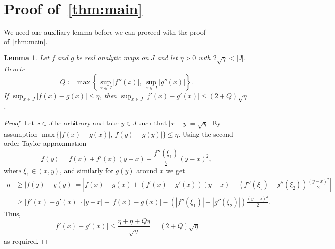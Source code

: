 \documentclass[12pt,]{article}
\def\cref#1{\ref{#1}}%
\newtheorem{lemma}[theorem]{Lemma}
\theoremstyle{definition}
\theoremstyle{remark}
\newcommand{\0}{\mathbf{0}}
\begin{document}
{%
\section{Proof of~\cref{thm:main}}\label{sec:ProofSufficientCond}

We need one auxiliary lemma before we can proceed with the proof of~\cref{thm:main}.

\begin{lemma}\label{thm:analyticity}
Let $f$ and $g$ be real analytic maps on $J$
and let $\eta>0$ with $2\sqrt{\eta}<|J|$.
Denote
 \[
   Q \coloneqq \max\left\{\sup_{x\in J} |f''(x)|,\, \sup_{x\in J}|g''(x)|\right\}.
 \]
If $\sup_{x\in J} |f(x)-g(x)| \leq \eta$, then $\sup_{x\in J} |f'(x)-g'(x)|\leq (2+Q)\sqrt{\eta}$.
\end{lemma}
\begin{proof}
Let $x\in J$ be arbitrary and take $y\in J$ such that $|x-y|=\sqrt{\eta}$. By assumption
$\max\{|f(x)-g(x)|,|f(y)-g(y)|\}\leq \eta$. Using the second order Taylor approximation 
\[
  f(y) = f(x) + f'(x)(y-x)+ \frac{f''(\xi_1)}{2}(y-x)^2,
\]
where $\xi_1\in(x,y)$, and similarly for $g(y)$ around $x$ we get
\begin{align*}
  \eta &\geq |f(y)-g(y)| =
  \left|f(x)-g(x)+(f'(x)-g'(x))(y-x)+(f''(\xi_1)-g''(\xi_2))\frac{(y-x)^2}{2}\right|\\
 &\geq |f'(x)-g'(x)|\cdot|y-x|-|f(x)-g(x)|-(|f''(\xi_1)|+|g''(\xi_2)|)\frac{(y-x)^2}{2}.
\end{align*}
  Thus,
  \[
    |f'(x)-g'(x)| \leq \frac{\eta+\eta+Q \eta}{\sqrt{\eta}} = (2+Q)\sqrt{\eta}
  \]
  as required.
\end{proof}


}
\end{document}
